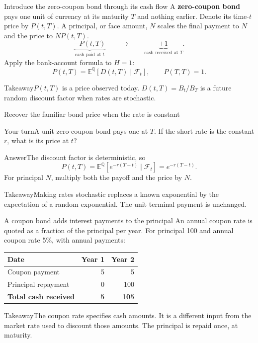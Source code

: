 \documentclass[handout,10pt,t,aspectratio=169]{beamer}
\newenvironment{pausebox}{\begin{block}{Your turn}}{\end{block}}
\newenvironment{answerbox}{\begin{exampleblock}{Answer}}{\end{exampleblock}}
\newenvironment{keybox}{\begin{exampleblock}{Takeaway}}{\end{exampleblock}}
\newcommand{\E}{\mathbb E}
\newcommand{\Q}{\mathbb Q}
\newcommand{\F}{\mathcal F}
\begin{document}
\begin{frame}{Introduce the zero-coupon bond through its cash flow}
A \textbf{zero-coupon bond} pays one unit of currency at its maturity \(T\)
and nothing earlier. Denote its time-\(t\) price by \(P(t,T)\).
A principal, or face amount, \(N\) scales the final payment to \(N\)
and the price to \(NP(t,T)\).
\[
 \underbrace{-P(t,T)}_{\text{cash paid at }t}
 \qquad\longrightarrow\qquad
 \underbrace{+1}_{\text{cash received at }T}.
\]
Apply the bank-account formula to \(H=1\):
\[
 \boxed{P(t,T)=\E^\Q[D(t,T)\mid\F_t],\qquad P(T,T)=1.}
\]
\begin{keybox}\(P(t,T)\) is a price observed today.
\(D(t,T)=B_t/B_T\) is a future random discount factor when rates are stochastic.\end{keybox}

\end{frame}

\begin{frame}{Recover the familiar bond price when the rate is constant}
\begin{pausebox}A unit zero-coupon bond pays one at \(T\).
If the short rate is the constant \(r\), what is its price at \(t\)?\end{pausebox}
\begin{answerbox}The discount factor is deterministic, so
\[
 P(t,T)=\E^\Q[e^{-r(T-t)}\mid\F_t]=\boxed{e^{-r(T-t)}}.
\]
For principal \(N\), multiply both the payoff and the price by \(N\).
\end{answerbox}
\begin{keybox}Making rates stochastic replaces a known exponential by the
expectation of a random exponential. The unit terminal payment is unchanged.\end{keybox}

\end{frame}

\begin{frame}{A coupon bond adds interest payments to the principal}
An annual coupon rate is quoted as a fraction of the principal per year.
For principal 100 and annual coupon rate 5\%, with annual payments:
\begin{center}\begin{tabular}{lrr}
\toprule Date & Year 1 & Year 2\\\midrule
Coupon payment & 5 & 5\\
Principal repayment & 0 & 100\\
\textbf{Total cash received} & \textbf{5} & \textbf{105}\\\bottomrule
\end{tabular}\end{center}
\begin{keybox}The coupon rate specifies cash amounts. It is a different
input from the market rate used to discount those amounts.
The principal is repaid once, at maturity.\end{keybox}
\end{frame}
\end{document}
